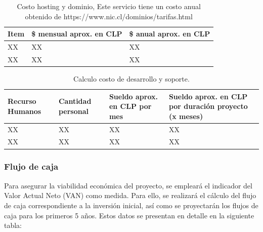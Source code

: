  \begin{table}[H]
    \begin{center}
        \begin{tabular}{ |l|l|l| }
            \hline 
            \textbf{Item} & \textbf{\$ mensual aprox. en CLP} & \textbf{\$ anual aprox. en CLP}\\ \hline
            XX & XX & XX  \\ \hline
            XX & XX & XX \\ \hline
        \end{tabular}
        \caption{Costo hosting y dominio, Este servicio tiene un costo anual obtenido de https://www.nic.cl/dominios/tarifas.html}
    \end{center}
\end{table}

\begin{table}[H]
    \begin{center}
        \begin{tabular}{ |m{2cm}|m{2cm}|m{5cm}|m{5cm}| }
            \hline 
            \textbf{Recurso Humanos} & \textbf{Cantidad personal} & \textbf{Sueldo aprox. en CLP por mes} &
            \textbf{Sueldo aprox. en CLP por duración proyecto (x meses)}\\ \hline
            XX & XX & XX & XX \\ \hline
            XX & XX & XX & XX\\ \hline
        \end{tabular}
        \caption{ Calculo costo de desarrollo y soporte.}
    \end{center}
\end{table}

\subsubsection{Flujo de caja}

Para asegurar la viabilidad económica del proyecto, se empleará el indicador del Valor Actual Neto (VAN) como medida. Para ello, se realizará el cálculo del flujo de caja correspondiente a la inversión inicial, así como se proyectarán los flujos de caja para los primeros 5 años. Estos datos se presentan en detalle en la siguiente tabla:

